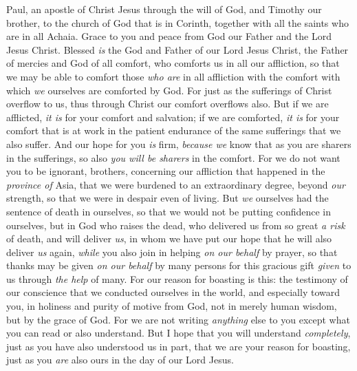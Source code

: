 
\begin{biblechapter} %
 Paul, an apostle of Christ Jesus through the will of God, and Timothy our brother, to the church of God that is in Corinth, together with all the saints who are in all Achaia.
\verse Grace to you and peace from God our Father and the Lord Jesus Christ.
 Blessed \textit{is} the God and Father of our Lord Jesus Christ, the Father of mercies and God of all comfort,
\verse who comforts us in all our affliction, so that we may be able to comfort those \textit{who are} in all affliction with the comfort with which \textit{we} ourselves are comforted by God.
\verse For just as the sufferings of Christ overflow to us, thus through Christ our comfort overflows also.
\verse But if we are afflicted, \textit{it is} for your comfort and salvation; if we are comforted, \textit{it is} for your comfort that is at work in the patient endurance of the same sufferings that we also suffer.
\verse And our hope for you \textit{is} firm, \textit{because we} know that as you are sharers in the sufferings, so also \textit{you will be sharers} in the comfort.
\verse For we do not want you to be ignorant, brothers, concerning our affliction that happened in the \textit{province of} Asia, that we were burdened to an extraordinary degree, beyond \textit{our} strength, so that we were in despair even of living.
\verse But \textit{we} ourselves had the sentence of death in ourselves, so that we would not be putting confidence in ourselves, but in God who raises the dead,
\verse who delivered us from so great \textit{a risk} of death, and will deliver \textit{us}, in whom we have put our hope that he will also deliver \textit{us} again,
\verse \textit{while} you also join in helping \textit{on our behalf} by prayer, so that thanks may be given \textit{on our behalf} by many persons for this gracious gift \textit{given} to us through \textit{the help} of many.
 For our reason for boasting is this: the testimony of our conscience that we conducted ourselves in the world, and especially toward you, in holiness and purity of motive from God, not in merely human wisdom, but by the grace of God.
\verse For we are not writing \textit{anything} else to you except what you can read or also understand. But I hope that you will understand \textit{completely},
\verse just as you have also understood us in part, that we are your reason for boasting, just as you \textit{are} also ours in the day of our Lord Jesus.

\end{biblechapter}
